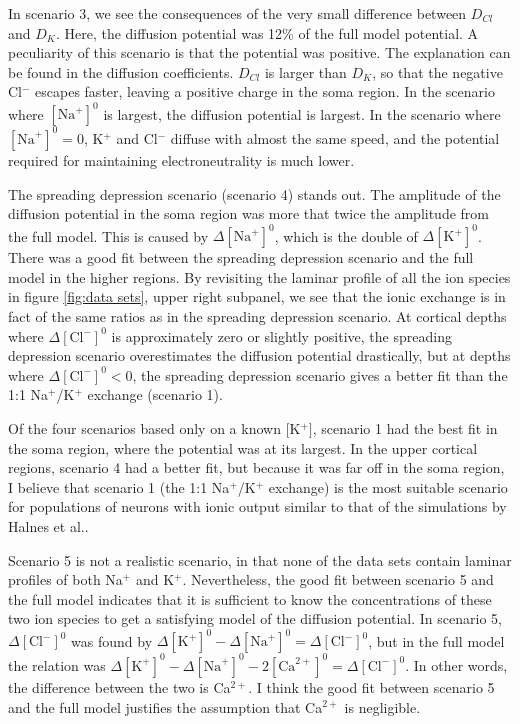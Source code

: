 \documentclass{uiophd}
\begin{document}
In scenario 3, we see the consequences of the very small difference between $D_{Cl}$ and $D_K$. Here, the diffusion potential was 12\% of the full model potential. A peculiarity of this scenario is that the potential was positive. The explanation can be found in the diffusion coefficients. $D_{Cl}$ is larger than $D_K$, so that the negative Cl$^-$ escapes faster, leaving a positive charge in the soma region. In the scenario where $[\text{Na}^+]^0$ is largest, the diffusion potential is largest. In the scenario where $[\text{Na}^+]^0=0$, K$^+$ and Cl$^-$ diffuse with almost the same speed, and the potential required for maintaining electroneutrality is much lower. 


The spreading depression scenario (scenario 4) stands out. The amplitude of the diffusion potential in the soma region was more that twice the amplitude from the full model. This is caused by $\Delta [\text{Na}^+]^0$, which is the double of $\Delta[\text{K}^+]^0$. There was a good fit between the spreading depression scenario and the full model in the higher regions. By revisiting the laminar profile of all the ion species in figure \ref{fig:data sets}, upper right subpanel, we see that the ionic exchange is in fact of the same ratios as in the spreading depression scenario. At cortical depths where $\Delta [\text{Cl}^-]^0$ is approximately zero or slightly positive, the spreading depression scenario overestimates the diffusion potential drastically, but at depths where  $\Delta [\text{Cl}^-]^0<0$, the spreading depression scenario gives a better fit than the 1:1 Na$^+$/K$^+$ exchange (scenario 1).


Of the four scenarios based only on a known [K$^+]$, scenario 1 had the best fit in the soma region, where the potential was at its largest. In the upper cortical regions, scenario 4 had a better fit, but because it was far off in the soma region, I believe that scenario 1 (the 1:1 Na$^+$/K$^+$ exchange) is the most suitable scenario for populations of neurons with ionic output similar to that of the simulations by Halnes et al.. 

Scenario 5 is not a realistic scenario, in that none of the data sets contain laminar profiles of both Na$^+$ and K$^+$. Nevertheless, the good fit between scenario 5 and the full model indicates that it is sufficient to know the concentrations of these two ion species to get a satisfying model of the diffusion potential. In scenario 5, $\Delta[\text{Cl}^-]^0$ was found by $\Delta[\text{K}^+]^0-\Delta [\text{Na}^+]^0=\Delta [\text{Cl}^-]^0$, but in the full model the relation was $\Delta[\text{K}^+]^0-\Delta [\text{Na}^+]^0 -2[\text{Ca}^{2+}]^0=\Delta [\text{Cl}^-]^0$. In other words, the difference between the two is Ca$^{2+}$. I think the good fit between scenario 5 and the full model justifies the assumption that Ca$^{2+}$ is negligible. 
\end{document}

